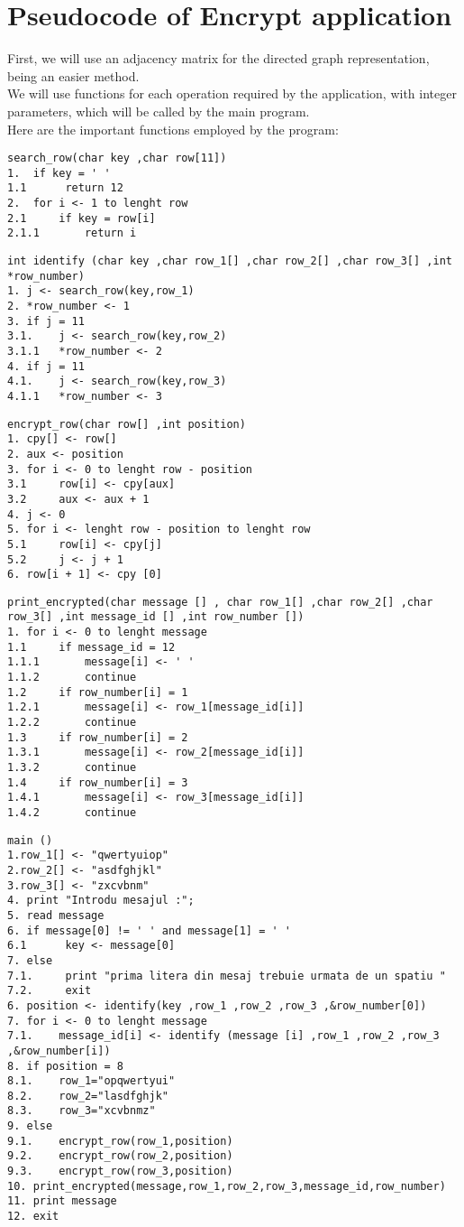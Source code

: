 \documentclass[14pt]{article}
\begin{document}
\section*{Pseudocode of Encrypt application}
First, we will use an adjacency matrix for the directed graph representation, being an easier method. 
\\
We will use functions for each operation required by the application, with integer parameters, which will be called by the main program.
\\
Here are the important functions employed by the program:
\begin{lstlisting}
search_row(char key ,char row[11])
1.	if key = ' '
1.1      return 12
2.	for i <- 1 to lenght row
2.1     if key = row[i]
2.1.1       return i
\end{lstlisting}
\begin{lstlisting}
int identify (char key ,char row_1[] ,char row_2[] ,char row_3[] ,int *row_number)
1. j <- search_row(key,row_1)
2. *row_number <- 1
3. if j = 11
3.1.    j <- search_row(key,row_2)
3.1.1   *row_number <- 2
4. if j = 11
4.1.    j <- search_row(key,row_3)
4.1.1   *row_number <- 3
\end{lstlisting}

\begin{lstlisting}
encrypt_row(char row[] ,int position)
1. cpy[] <- row[]
2. aux <- position
3. for i <- 0 to lenght row - position
3.1     row[i] <- cpy[aux]
3.2     aux <- aux + 1
4. j <- 0
5. for i <- lenght row - position to lenght row
5.1     row[i] <- cpy[j]
5.2     j <- j + 1
6. row[i + 1] <- cpy [0]
\end{lstlisting}
\begin{lstlisting}
print_encrypted(char message [] , char row_1[] ,char row_2[] ,char row_3[] ,int message_id [] ,int row_number [])
1. for i <- 0 to lenght message
1.1     if message_id = 12
1.1.1       message[i] <- ' '
1.1.2       continue
1.2     if row_number[i] = 1
1.2.1       message[i] <- row_1[message_id[i]]
1.2.2       continue
1.3     if row_number[i] = 2
1.3.1       message[i] <- row_2[message_id[i]]
1.3.2       continue
1.4     if row_number[i] = 3
1.4.1       message[i] <- row_3[message_id[i]]
1.4.2       continue

\end{lstlisting}
\begin{lstlisting}
main ()
1.row_1[] <- "qwertyuiop"
2.row_2[] <- "asdfghjkl"
3.row_3[] <- "zxcvbnm"
4. print "Introdu mesajul :";
5. read message
6. if message[0] != ' ' and message[1] = ' '
6.1      key <- message[0]
7. else
7.1.     print "prima litera din mesaj trebuie urmata de un spatiu "
7.2.     exit
6. position <- identify(key ,row_1 ,row_2 ,row_3 ,&row_number[0])
7. for i <- 0 to lenght message
7.1.    message_id[i] <- identify (message [i] ,row_1 ,row_2 ,row_3 ,&row_number[i])
8. if position = 8
8.1.    row_1="opqwertyui"
8.2.    row_2="lasdfghjk"
8.3.    row_3="xcvbnmz"
9. else
9.1.    encrypt_row(row_1,position)
9.2.    encrypt_row(row_2,position)
9.3.    encrypt_row(row_3,position)
10. print_encrypted(message,row_1,row_2,row_3,message_id,row_number)
11. print message
12. exit
\end{lstlisting}
\end{document}
